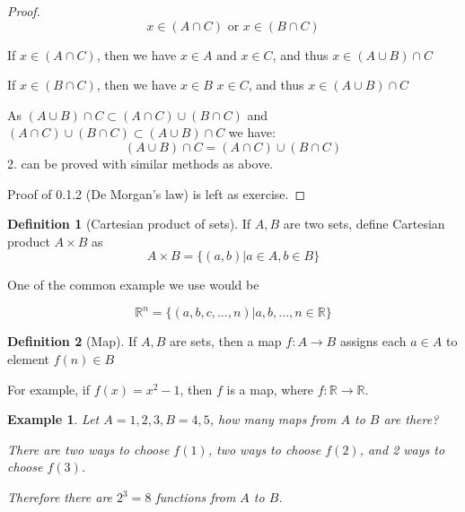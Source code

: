\documentclass{article}
\theoremstyle{MyNonumberplain}
\theoremstyle{break}
\newtheorem*{proof}{Proof. }
\newcommand{\R}{\mathbb{R}}
\theoremstyle{break}
\newtheorem{example}{Example}[section]
\theoremstyle{break}
\theoremstyle{definition}
\theoremstyle{break}
\newtheorem{definition}{Definition}[section]
\begin{document}
\begin{thmbox}
\begin{prfbox}
\begin{proof}
            \[ x \in (A \cap C) \text{ or } x \in (B \cap C) \]

            If $x \in (A \cap C)$, then we have $x \in A \text{ and } x \in C$, and thus $x
            \in (A \cup B) \cap C$
            \bigskip

            If $x \in (B \cap C)$, then we have $x \in B$  $x \in C$, and thus $x \in
            (A \cup B) \cap C$
            \bigskip

            As $(A \cup B) \cap C \subset (A \cap C) \cup (B \cap C)$ and $(A \cap C)
            \cup (B \cap C) \subset (A \cup B) \cap C$ we have:
            \[ (A \cup B) \cap C = (A \cap C) \cup (B \cap C) \]
            2. can be proved with similar methods as above.\bigskip

            Proof of 0.1.2 (De Morgan's law) is left as exercise.
          \end{proof}
    \end{prfbox}
\end{thmbox}




\begin{defbox}
    \begin{definition}[Cartesian product of sets]
        If $A, B$ are two sets, define Cartesian product $A \times B$ as
        \[ A \times B = \{ (a, b) |a \in A, b \in B \} \]    
    \end{definition}    
\end{defbox}

One of the common example we use would be 

    $$\R^n=\{(a,b,c,...,n)|a,b,...,n\in\R\}$$

\begin{defbox}
    \begin{definition}[Map]
        If $A,B$ are sets, then a map $f:A\to B$ assigns each $a\in A$ to element $f(n)\in B$
    \end{definition}
\end{defbox}

For example, if $f(x)=x^2-1$, then $f$ is a map, where $f:\R\to\R$.

\begin{expbox}
    \begin{example}
        Let $A={1,2,3},B={4,5}$, how many maps from $A$ to $B$ are there?\bigskip

        There are two ways to choose $f(1)$, two ways to choose $f(2)$, and 2 ways to choose $f(3)$. \bigskip

        Therefore there are $2^3=8$ functions from $A$ to $B$.
    \end{example}
\end{expbox}
\end{document}
